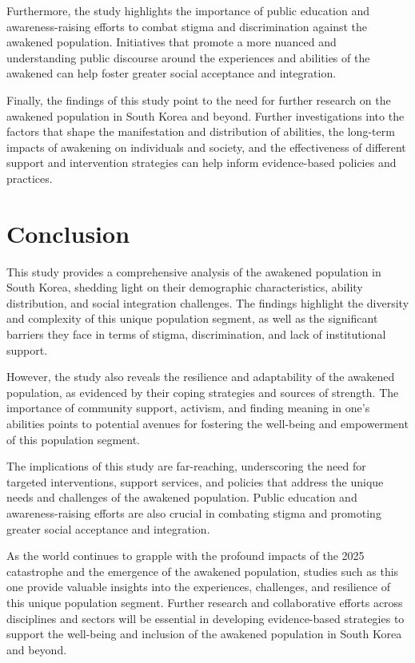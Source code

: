 \documentclass[12pt, a4paper]{article}
\begin{document}
Furthermore, the study highlights the importance of public education and awareness-raising efforts to combat stigma and discrimination against the awakened population. Initiatives that promote a more nuanced and understanding public discourse around the experiences and abilities of the awakened can help foster greater social acceptance and integration.

Finally, the findings of this study point to the need for further research on the awakened population in South Korea and beyond. Further investigations into the factors that shape the manifestation and distribution of abilities, the long-term impacts of awakening on individuals and society, and the effectiveness of different support and intervention strategies can help inform evidence-based policies and practices.

\section{Conclusion}
This study provides a comprehensive analysis of the awakened population in South Korea, shedding light on their demographic characteristics, ability distribution, and social integration challenges. The findings highlight the diversity and complexity of this unique population segment, as well as the significant barriers they face in terms of stigma, discrimination, and lack of institutional support.

However, the study also reveals the resilience and adaptability of the awakened population, as evidenced by their coping strategies and sources of strength. The importance of community support, activism, and finding meaning in one's abilities points to potential avenues for fostering the well-being and empowerment of this population segment.

The implications of this study are far-reaching, underscoring the need for targeted interventions, support services, and policies that address the unique needs and challenges of the awakened population. Public education and awareness-raising efforts are also crucial in combating stigma and promoting greater social acceptance and integration.

As the world continues to grapple with the profound impacts of the 2025 catastrophe and the emergence of the awakened population, studies such as this one provide valuable insights into the experiences, challenges, and resilience of this unique population segment. Further research and collaborative efforts across disciplines and sectors will be essential in developing evidence-based strategies to support the well-being and inclusion of the awakened population in South Korea and beyond.

\newpage



\end{document}
